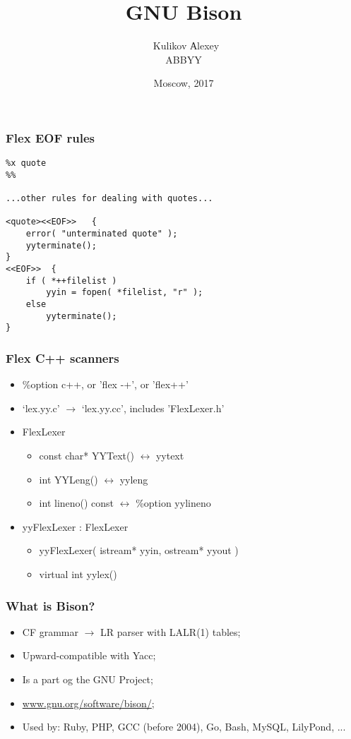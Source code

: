 \documentclass[14pt]{beamer}
\title{GNU Bison}
\subtitle{\footnotesize{}}
\author{\small{%
		~Kulikov Аlexey}\\%
	\vspace{30pt}%
	ABBYY%
	\vspace{20pt}%
}
\date{\small{Moscow, 2017}}
\begin{document}
	
	\maketitle

\begin{frame}[fragile]
	
	\frametitle{Flex EOF rules}

\begin{small}
	\begin{lstlisting}
%x quote
%%

...other rules for dealing with quotes...

<quote><<EOF>>   {
	error( "unterminated quote" );
	yyterminate();
}
<<EOF>>  {
	if ( *++filelist )
		yyin = fopen( *filelist, "r" );
	else
		yyterminate();
}
	\end{lstlisting}
\end{small}

\end{frame}
	
\begin{frame}[fragile]
	
	\frametitle{Flex C++ scanners}
	
	\begin{itemize}
		\item \%option c++, or 'flex -+', or 'flex++'
		\item `lex.yy.c' $\rightarrow$ `lex.yy.cc', includes 'FlexLexer.h'
		\item FlexLexer \begin{itemize}
			\item const char* YYText() $\leftrightarrow$ yytext
			\item int YYLeng() $\leftrightarrow$ yyleng
			\item int lineno() const $\leftrightarrow$ \%option yylineno
		\end{itemize}
		\item yyFlexLexer : FlexLexer \begin{itemize}
			\item yyFlexLexer( istream* yyin, ostream* yyout )
			\item virtual int yylex()
		\end{itemize}
	\end{itemize}
	
\end{frame}

\begin{frame}[fragile]
	
	\frametitle{What is Bison?}	
	
	\begin{itemize}
		\item CF grammar $\rightarrow$ LR parser with LALR(1) tables;
		\item Upward-compatible with Yacc;
		\item Is a part og the GNU Project;
		\item \href{https://www.gnu.org/software/bison/}{www.gnu.org/software/bison/};
		\item Used by: Ruby, PHP, GCC (before 2004), Go, Bash, MySQL, LilyPond, ...
	\end{itemize}
	
\end{frame}
\end{document}
